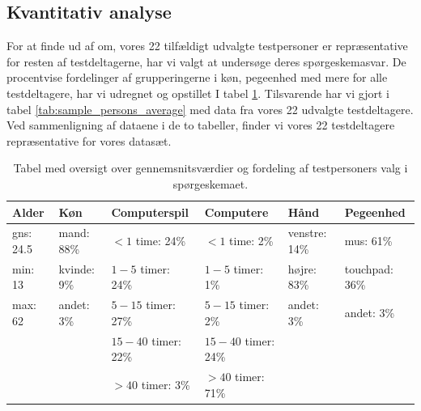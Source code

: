 \subsection*{Kvantitativ analyse}
For at finde ud af om, vores 22 tilfældigt udvalgte testpersoner er repræsentative for resten af testdeltagerne, har vi valgt at undersøge deres spørgeskemasvar. De procentvise fordelinger af grupperingerne i køn, pegeenhed med mere for alle testdeltagere, har vi udregnet og opstillet I tabel \ref{tab:persons_average}. Tilsvarende har vi gjort i tabel \ref{tab:sample_persons_average} med data fra vores 22 udvalgte testdeltagere. Ved sammenligning af dataene i de to tabeller, finder vi vores 22 testdeltagere repræsentative for vores datasæt.

\begin{table}[h]
	\centering
	\begin{tabular}{llllll}
		Alder           & Køn               & Computerspil              & Computere                 & Hånd                & Pegeenhed            \\\hline
		gns: \hfill24.5 & mand: \hfill88\%  & $<1$ time: \hfill24\%     & $<1$ time: \hfill2\%      & venstre: \hfill14\% & mus: \hfill61\%      \\
		min: \hfill13   & kvinde: \hfill9\% & $1-5$ timer: \hfill24\%   & $1-5$ timer: \hfill1\%    & højre: \hfill83\%   & touchpad: \hfill36\% \\
		max: \hfill62   & andet: \hfill3\%  & $5-15$ timer: \hfill27\%  & $5-15$ timer: \hfill2\%   & andet: \hfill3\%    & andet: \hfill3\%     \\
		                &                   & $15-40$ timer: \hfill22\% & $15-40$ timer: \hfill24\% &                     &\\
		                &                   & $>40$ timer: \hfill3\%    & $>40$ timer: \hfill71\%   &                     &
	\end{tabular}
	\caption{Tabel med oversigt over gennemsnitsværdier og fordeling af testpersoners valg i spørgeskemaet.}
	\label{tab:persons_average}
\end{table}

